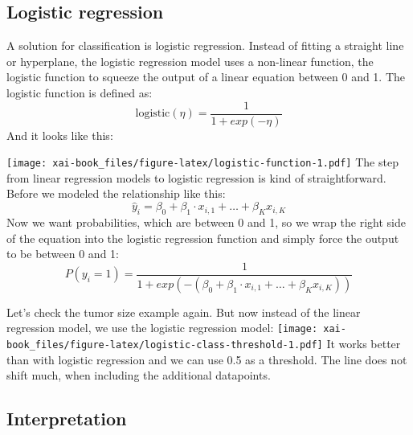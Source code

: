 \documentclass[12pt,]{krantz}
\theoremstyle{definition}
\theoremstyle{definition}
\theoremstyle{definition}
\theoremstyle{remark}
\begin{document}
\subsection{Logistic regression}\label{logistic-regression}

A solution for classification is logistic regression. Instead of fitting
a straight line or hyperplane, the logistic regression model uses a
non-linear function, the logistic function to squeeze the output of a
linear equation between 0 and 1. The logistic function is defined as:
\[ \text{logistic}(\eta) = \frac{1}{1 + exp(-\eta)}\] And it looks like
this:

\texttt{[image: xai-book\_files/figure-latex/logistic-function-1.pdf]}
The step from linear regression models to logistic regression is kind of
straightforward. Before we modeled the relationship like this:
\[\hat{y}_{i} = \beta_{0} + \beta_{1} \cdot x_{i,1} + \ldots + \beta_{K} x_{i,K} \]
Now we want probabilities, which are between 0 and 1, so we wrap the
right side of the equation into the logistic regression function and
simply force the output to be between 0 and 1:
\[P(y_{i}=1) =  \frac{1}{1 + exp(-(\beta_{0} + \beta_{1} \cdot x_{i,1} + \ldots + \beta_{K} x_{i,K}))}\]

Let's check the tumor size example again. But now instead of the linear
regression model, we use the logistic regression model:
\texttt{[image: xai-book\_files/figure-latex/logistic-class-threshold-1.pdf]}
It works better than with logistic regression and we can use 0.5 as a
threshold. The line does not shift much, when including the additional
datapoints.

\subsection{Interpretation}\label{interpretation-1}
\end{document}
